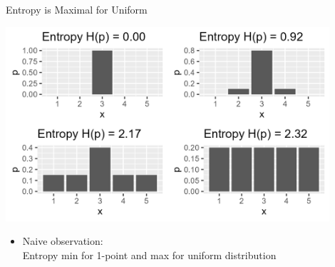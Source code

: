 \documentclass[11pt,compress,t,notes=noshow, xcolor=table]{beamer}
\begin{document}
\begin{vbframe}{Entropy is Maximal for Uniform}

\begin{center}
\includegraphics[width = 0.9\textwidth]{figure/max_entropy.png}
\end{center}

\begin{itemize}
   \item Naive observation:\\
   Entropy min for 1-point and max for uniform distribution
\end{itemize}

\end{vbframe}
\end{document}
